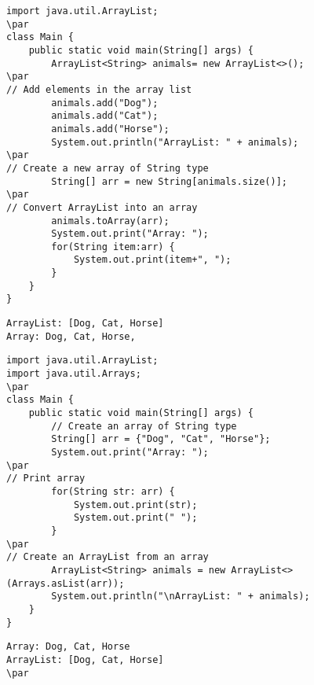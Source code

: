 \documentclass{book}
\def\lthtmlcheckvsize{\ifdim\ht\sizebox<\vsize 
  \ifdim\wd\sizebox<\hsize\expandafter\hfill\fi \expandafter\vfill
  \else\expandafter\vss\fi}%
\begin{document}
{\newpage\clearpage
{}%
\begin{lstlisting}
import java.util.ArrayList;
\par
class Main {
    public static void main(String[] args) {
        ArrayList<String> animals= new ArrayList<>();
\par
// Add elements in the array list
        animals.add("Dog");
        animals.add("Cat");
        animals.add("Horse");
        System.out.println("ArrayList: " + animals);
\par
// Create a new array of String type
        String[] arr = new String[animals.size()];
\par
// Convert ArrayList into an array
        animals.toArray(arr);
        System.out.print("Array: ");
        for(String item:arr) {
            System.out.print(item+", ");
        }
    }
}
\end{lstlisting}%
\lthtmlfigureZ
\lthtmlcheckvsize\clearpage}

{\newpage\clearpage
{}%
\begin{lstlisting}
ArrayList: [Dog, Cat, Horse]
Array: Dog, Cat, Horse,
\end{lstlisting}%
\lthtmlfigureZ
\lthtmlcheckvsize\clearpage}

{\newpage\clearpage
{}%
\begin{lstlisting}
import java.util.ArrayList;
import java.util.Arrays;
\par
class Main {
    public static void main(String[] args) {
        // Create an array of String type
        String[] arr = {"Dog", "Cat", "Horse"};
        System.out.print("Array: ");
\par
// Print array
        for(String str: arr) {
            System.out.print(str);
            System.out.print(" ");
        }
\par
// Create an ArrayList from an array
        ArrayList<String> animals = new ArrayList<>(Arrays.asList(arr));
        System.out.println("\nArrayList: " + animals);
    }
}
\end{lstlisting}%
\lthtmlfigureZ
\lthtmlcheckvsize\clearpage}

{\newpage\clearpage
{}%
\begin{lstlisting}
Array: Dog, Cat, Horse
ArrayList: [Dog, Cat, Horse]
\par
\end{lstlisting}%
\lthtmlfigureZ
\lthtmlcheckvsize\clearpage}
\end{document}
